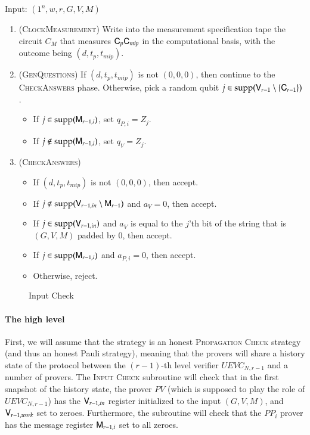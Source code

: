 \vspace{10pt}
\begin{center}
\begin{mdframed}
    Input: $(1^n,w,r,G,V,M)$
    
	\begin{enumerate}
		\item (\textsc{ClockMeasurement}) Write into the measurement specification tape the circuit $C_M$ that measures ${\mathsf{C}}_p {\mathsf{C}}_{mip}$ in the computational basis, with the outcome being $(d,t_p,t_{mip})$.
		\item (\textsc{GenQuestions}) If $(d,t_p,t_{mip})$ is not $(0,0,0)$, then continue to the \textsc{CheckAnswers} phase. Otherwise, pick a random qubit $j \in \operatorname{supp}({\mathsf{V}}_{r-1} \setminus \{{\mathsf{C}}_{r-1} \})$. 
		\begin{itemize}
			\item If $j \in \operatorname{supp}({\mathsf{M}}_{r-1,i})$, set $q_{P,i} = Z_j$.
			\item If $j \notin \operatorname{supp}({\mathsf{M}}_{r-1,i})$, set $q_V = Z_j$.
		\end{itemize}
		
		\item (\textsc{CheckAnswers}) 
		\begin{itemize}
			\item If $(d,t_p,t_{mip})$ is not $(0,0,0)$, then accept. 
			\item If $j \notin \operatorname{supp}({\mathsf{V}}_{r-1,in} \setminus {\mathsf{M}}_{r-1})$ and $a_V = 0$, then accept. 
			\item If $j \in \operatorname{supp}({\mathsf{V}}_{r-1,in})$ and $a_V$ is equal to the $j$'th bit of the string that is $(G,V,M)$ padded by $0$, then accept. 
			\item If $j \in \operatorname{supp}({\mathsf{M}}_{r-1,i})$ and $a_{P,i} = 0$, then accept.
			\item Otherwise, reject.
		\end{itemize}
	\end{enumerate}    
\end{mdframed}
\end{center}
\begin{figure}[H]
\caption{Input Check}
\label{fig:input_check}
\end{figure}

\paragraph{The high level} First, we will assume that the strategy is an honest \textsc{Propagation Check} strategy (and thus an honest Pauli strategy), meaning that the provers will share a history state of the protocol between the $(r-1)$-th level verifier $UEVC_{N,r-1}$ and a number of provers. The \textsc{Input Check} subroutine will check that in the first snapshot of the history state, the prover $PV$ (which is supposed to play the role of $UEVC_{N,r-1}$) has the ${\mathsf{V}}_{r-1,in}$ register initialized to the input $(G,V,M)$, and ${\mathsf{V}}_{r-1,work} $ set to zeroes. Furthermore, the subroutine will check that the $PP_i$ prover has the message register ${\mathsf{M}}_{r-1,i}$ set to all zeroes.

